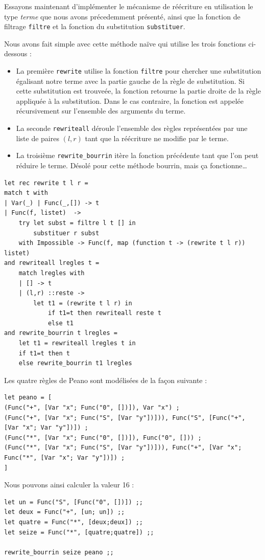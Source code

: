 \documentclass[11pt]{book}
\begin{document}
Essayons maintenant d'implémenter le mécanisme de réécriture en utilisation le type 
\textit{terme} que nous avons précedemment présenté, ainsi que la fonction de filtrage \verb+filtre+ et 
la fonction du substitution \verb+substituer+.

Nous avons fait simple avec cette méthode naïve qui utilise les trois fonctions ci-dessous :
\begin{itemize}
	\item La première \verb+rewrite+ utilise la fonction \verb+filtre+ pour chercher une substitution
	égalisant notre terme avec la partie gauche de la règle de substitution. Si cette substitution est trouveée, la 
	fonction retourne la partie droite de la règle appliquée à la substitution. Dans le cas contraire, la fonction
	est appelée récursivement sur l'ensemble des arguments du terme.
	\item  La seconde \verb+rewriteall+ déroule l'ensemble des règles représentées par une liste de paires $(l,r)$ tant
	que la réécriture ne modifie par le terme.
	\item La troisième \verb+rewrite_bourrin+ itère la fonction précédente tant que l'on peut réduire le terme.
	Désolé pour cette méthode bourrin, mais ça fonctionne\dots
\end{itemize}

\begin{Verbatim}
let rec rewrite t l r =
match t with
| Var(_) | Func(_,[]) -> t
| Func(f, listet)  -> 
	try let subst = filtre l t [] in
		substituer r subst 
	with Impossible -> Func(f, map (function t -> (rewrite t l r)) listet)
and rewriteall lregles t =
	match lregles with
	| [] -> t
	| (l,r) ::reste -> 
		let t1 = (rewrite t l r) in
			if t1=t then rewriteall reste t 
			else t1
and rewrite_bourrin t lregles =
	let t1 = rewriteall lregles t in
	if t1=t then t
	else rewrite_bourrin t1 lregles
\end{Verbatim}

Les quatre règles de Peano sont modélisées de la façon suivante :
\begin{Verbatim}
let peano = [
(Func("+", [Var "x"; Func("0", [])]), Var "x") ;
(Func("+", [Var "x"; Func("S", [Var "y"])])), Func("S", [Func("+", [Var "x"; Var "y"])]) ;
(Func("*", [Var "x"; Func("0", [])]), Func("0", [])) ;
(Func("*", [Var "x"; Func("S", [Var "y"])])), Func("+", [Var "x"; Func("*", [Var "x"; Var "y"])]) ;
] 
\end{Verbatim}

Nous pouvons ainsi calculer la valeur 16 :
\begin{Verbatim}
let un = Func("S", [Func("0", [])]) ;;
let deux = Func("+", [un; un]) ;;
let quatre = Func("*", [deux;deux]) ;;
let seize = Func("*", [quatre;quatre]) ;;

rewrite_bourrin seize peano ;;    
	
\end{Verbatim}
\end{document}
